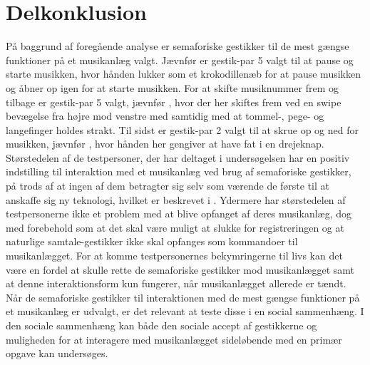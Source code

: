 \section{Delkonklusion}
\label{ValgAfGestikkerDelkonklusion}
%
På baggrund af foregående analyse er semaforiske gestikker til de mest gængse funktioner på et musikanlæg valgt. Jævnfør  er gestik-par 5 valgt til at pause og starte musikken, hvor hånden lukker som et krokodillenæb for at pause musikken og åbner op igen for at starte musikken. For at skifte musiknummer frem og tilbage er gestik-par 5 valgt, jævnfør , hvor der her skiftes frem ved en swipe bevægelse fra højre mod venstre med samtidig med at tommel-, pege- og langefinger holdes strakt. Til sidst er gestik-par 2 valgt til at skrue op og ned for musikken, jævnfør , hvor hånden her gengiver at have fat i en drejeknap. Størstedelen af de testpersoner, der har deltaget i undersøgelsen har en positiv indstilling til interaktion med et musikanlæg ved brug af semaforiske gestikker, på trods af at ingen af dem betragter sig selv som værende de første til at anskaffe sig ny teknologi, hvilket er beskrevet i . Ydermere har størstedelen af testpersonerne ikke et problem med at blive opfanget af deres musikanlæg, dog med forebehold som at det skal være muligt at slukke for registreringen og at naturlige samtale-gestikker ikke skal opfanges som kommandoer til musikanlægget. For at komme testpersonernes bekymringerne til livs kan det være en fordel at skulle rette de semaforiske gestikker mod musikanlægget samt at denne interaktionsform kun fungerer, når musikanlægget allerede er tændt. \blankline
%
Når de semaforiske gestikker til interaktionen med de mest gængse funktioner på et musikanlæg er udvalgt, er det relevant at teste disse i en social sammenhæng. I den sociale sammenhæng kan både den sociale accept af gestikkerne og muligheden for at interagere med musikanlægget sideløbende med en primær opgave kan undersøges. 